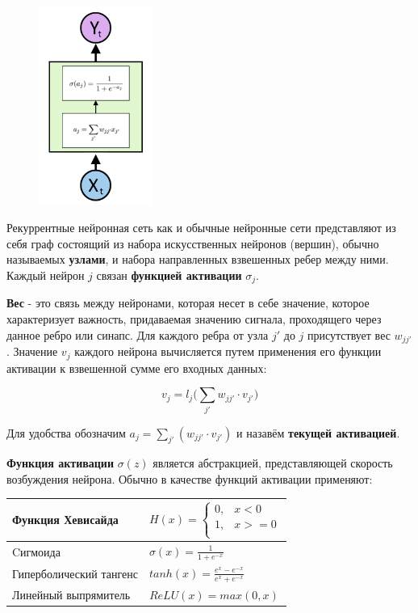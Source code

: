 \documentclass[a4paper,russian]{article}
\begin{document}
	\begin{figure}
		\centering
		\captionsetup{justification=centering}
		\includegraphics[height=65mm]{img/1.png}
	\end{figure}
	
	Рекуррентные нейронная сеть как и обычные нейронные сети представляют из себя граф состоящий из набора искусственных нейронов (вершин), обычно называемых \textbf{узлами}, и набора направленных взвешенных ребер между ними. Каждый нейрон $j$ связан \textbf{функцией активации} $\sigma_j$.
	
	\textbf{Вес} - это связь между нейронами, которая несет в себе значение, которое характеризует важность, придаваемая значению сигнала, проходящего через данное ребро или синапс. Для каждого ребра от узла $j'$ до $j$ присутствует вес $w_{jj'}$. Значение $v_j$ каждого нейрона вычисляется путем применения его функции активации к взвешенной сумме его входных данных: 
	
	$$v_j = l_j\bigg(\sum_{j'} w_{jj'} \cdot v_{j'}\bigg)$$
	
	Для удобства обозначим $a_j = \sum_{j'} (w_{jj'} \cdot v_{j'})$ и назавём \textbf{текущей активацией}. 
	
	\textbf{Функция активации} $\sigma(z)$ является абстракцией, представляющей скорость возбуждения нейрона. Обычно в качестве функций активации применяют:
	
	\begin{table}[h]
		\centering
		\begin{tabular}{|l|l|} 
			\hline
			Функция Хевисайда       &   
			$ H(x) = 
			\begin{cases}
				0, & x < 0 \\
				1, & x >= 0 \\
			\end{cases}$ \\ 
			\hline
			Cигмоида                &  $\sigma(x) = \frac{1}{1 + e^{-x}}$ \\ 
			\hline
			Гиперболический тангенс &  $tanh(x) = \frac{e^x - e^{-x}}{e^x + e^{-x}}$ \\ 
			\hline
			Линейный выпрямитель    &  $ReLU(x) = max(0, x)$ \\
			\hline
		\end{tabular}
	\end{table}
\end{document}
